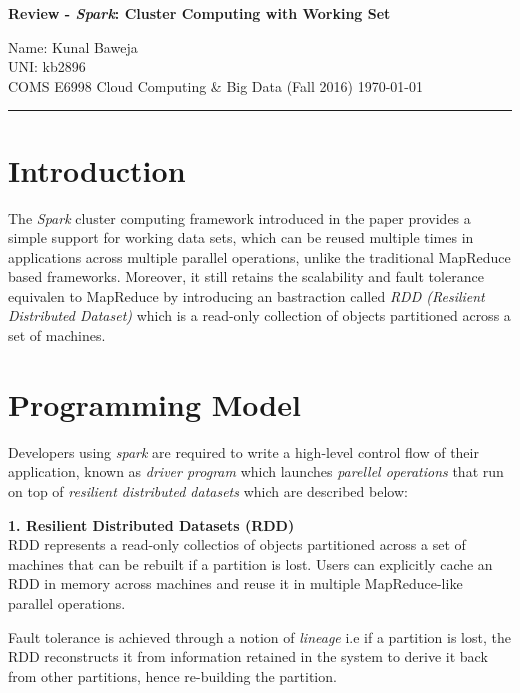\documentclass[12pt, a4paper]{article}
\def\name{Kunal Baweja}
\def\uni{kb2896}
\def\assignment{Review - \textit{Spark}: Cluster Computing with Working Set}
\def\subject{COMS E6998 Cloud Computing \& Big Data (Fall 2016)}
\begin{document}
\begin{center}
    \textbf{\large \assignment}
    \vspace{0.1em}
\end{center}

Name: {\name}\\
UNI: {\uni}\\
{\subject} \hfill {\today}

\rule{\textwidth}{0.2pt}

\section*{Introduction}
The \textit{Spark}\cite{Zaharia:2010:SCC:1863103.1863113} cluster computing framework introduced in the paper provides a simple support for working data sets, which can be reused multiple times in applications across multiple parallel operations, unlike the traditional MapReduce based frameworks. Moreover, it still retains the scalability and fault tolerance equivalen to  MapReduce by introducing an bastraction called \textit{RDD (Resilient Distributed Dataset)} which is a read-only collection of objects partitioned across a set of machines.\par

\section*{Programming Model}
Developers using \textit{spark}\cite{Zaharia:2010:SCC:1863103.1863113} are required to write a high-level control flow of their application, known as \textit{driver program} which launches \textit{parellel operations} that run on top of \textit{resilient distributed datasets} which are described below:

\textbf{1. Resilient Distributed Datasets (RDD)}\\
RDD represents a read-only collectios of objects partitioned across a set of machines that can be rebuilt if a partition is lost. Users can explicitly
cache an RDD in memory across machines and reuse it in multiple MapReduce-like parallel operations.\par
Fault tolerance is achieved through a notion of \textit{lineage} i.e if a partition is lost, the RDD reconstructs it from information retained in the system to derive it back from other partitions, hence re-building the partition.
\end{document}
